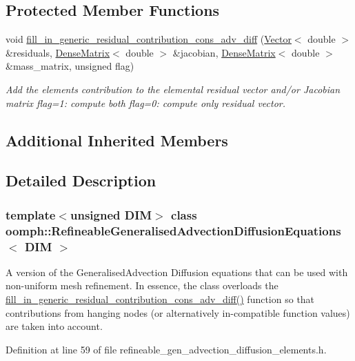 \subsection*{Protected Member Functions}
\begin{DoxyCompactItemize}
\item 
void \hyperlink{classoomph_1_1RefineableGeneralisedAdvectionDiffusionEquations_abd0535533c7133651ac18ad8e025f139}{fill\+\_\+in\+\_\+generic\+\_\+residual\+\_\+contribution\+\_\+cons\+\_\+adv\+\_\+diff} (\hyperlink{classoomph_1_1Vector}{Vector}$<$ double $>$ \&residuals, \hyperlink{classoomph_1_1DenseMatrix}{Dense\+Matrix}$<$ double $>$ \&jacobian, \hyperlink{classoomph_1_1DenseMatrix}{Dense\+Matrix}$<$ double $>$ \&mass\+\_\+matrix, unsigned flag)
\begin{DoxyCompactList}\small\item\em Add the element\textquotesingle{}s contribution to the elemental residual vector and/or Jacobian matrix flag=1\+: compute both flag=0\+: compute only residual vector. \end{DoxyCompactList}\end{DoxyCompactItemize}
\subsection*{Additional Inherited Members}


\subsection{Detailed Description}
\subsubsection*{template$<$unsigned D\+IM$>$\newline
class oomph\+::\+Refineable\+Generalised\+Advection\+Diffusion\+Equations$<$ D\+I\+M $>$}

A version of the Generalised\+Advection Diffusion equations that can be used with non-\/uniform mesh refinement. In essence, the class overloads the \hyperlink{classoomph_1_1RefineableGeneralisedAdvectionDiffusionEquations_abd0535533c7133651ac18ad8e025f139}{fill\+\_\+in\+\_\+generic\+\_\+residual\+\_\+contribution\+\_\+cons\+\_\+adv\+\_\+diff()} function so that contributions from hanging nodes (or alternatively in-\/compatible function values) are taken into account. 

Definition at line 59 of file refineable\+\_\+gen\+\_\+advection\+\_\+diffusion\+\_\+elements.\+h.



